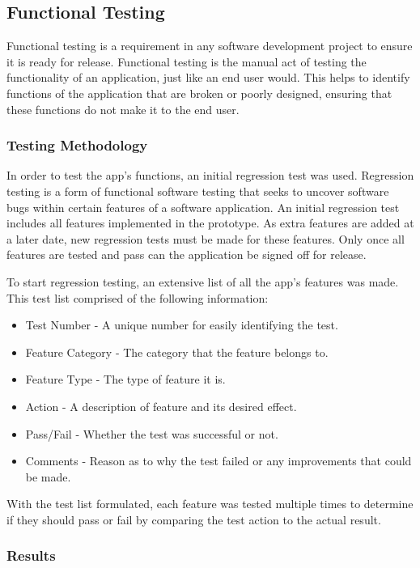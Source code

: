 \subsection{Functional Testing}

Functional testing is a requirement in any software development project to ensure it is ready for release. Functional testing is the manual act of testing the functionality of an application, just like an end user would. This helps to  identify functions of the application that are broken or poorly designed, ensuring that these functions do not make it to the end user.

\subsubsection{Testing Methodology}

In order to test the app's functions, an initial regression test was used. Regression testing is a form of functional software testing that seeks to uncover software bugs within certain features of a software application. An initial regression test includes all features implemented in the prototype. As extra features are added at a later date, new regression tests must be made for these features. Only once all features are tested and pass can the application be signed off for release.

To start regression testing, an extensive list of all the app's features was made. This test list comprised of the following information:

\begin{itemize}
	\item Test Number - A unique number for easily identifying the test.
	\item Feature Category - The category that the feature belongs to.
	\item Feature Type - The type of feature it is.
	\item Action - A description of feature and its desired effect.
	\item Pass/Fail - Whether the test was successful or not.
	\item Comments - Reason as to why the test failed or any improvements that could be made.
\end{itemize}

With the test list formulated, each feature was tested multiple times to determine if they should pass or fail by comparing the test action to the actual result.

\subsubsection{Results}

